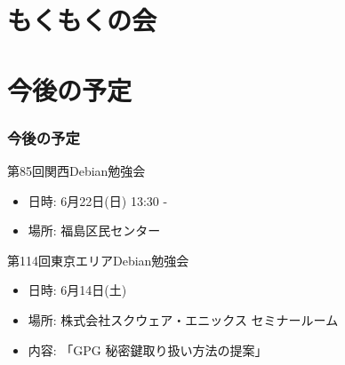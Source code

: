 \documentclass[cjk,dvipdfmx,10pt,compress,%
hyperref={bookmarks=true,bookmarksnumbered=true,bookmarksopen=false,%
colorlinks=false,%
pdftitle={第 84 回 関西 Debian 勉強会},%
pdfauthor={倉敷・のがた・佐々木・かわだ・八津尾},%
pdfsubject={資料},%
}]{beamer}
\begin{document}

\section{もくもくの会}


\section{今後の予定}
\begin{frame}[fragile]
\frametitle{今後の予定}

\begin{block}{第85回関西Debian勉強会}
  \begin{itemize}
  \item 日時: 6月22日(日) 13:30 -
  \item 場所: 福島区民センター
  \end{itemize}
\end{block}

\begin{block}{第114回東京エリアDebian勉強会}
  \begin{itemize}
  \item 日時: 6月14日(土)
  \item 場所: 株式会社スクウェア・エニックス セミナールーム
  \item 内容: 「GPG 秘密鍵取り扱い方法の提案」
  \end{itemize}
\end{block}

\end{frame}

\takahashi[50]{  }
\end{document}
